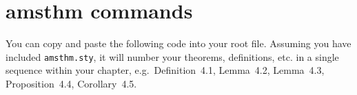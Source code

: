 
\chapter{amsthm commands}
\label{theorem}

You can copy and paste the following code into your root file.
Assuming you have included \verb"amsthm.sty", it will number your theorems,
definitions, etc. in a single sequence within your chapter,
e.g.~Definition~4.1, Lemma~4.2, Lemma~4.3, Proposition~4.4, Corollary~4.5.

\begin{smallverbatim} %
 \theoremstyle{plain}%
 \newtheorem{theorem}{Theorem}[chapter]
 \newtheorem{lemma}[theorem]{Lemma}
 \newtheorem{proposition}[theorem]{Proposition}
 \newtheorem{corollary}[theorem]{Corollary}
 \newtheorem{conjecture}[theorem]{Conjecture}

 \newtheorem*{theorem*}{Theorem}
 \newtheorem*{lemma*}{Lemma}
 \newtheorem*{proposition*}{Proposition}
 \newtheorem*{corollary*}{Corollary}
 \newtheorem*{conjecture*}{Conjecture}

 \theoremstyle{definition}
 \newtheorem{definition}[theorem]{Definition}
 \newtheorem{myexample}[theorem]{myexample}
 \newtheorem{prob}[theorem]{Problem}
 \newtheorem{remark}[theorem]{Remark}
 \newtheorem{notation}[theorem]{Notation}
 \newtheorem{exer}[theorem]{Exercise}
 \newtheorem{criterion}[theorem]{Criterion}
 \newtheorem{algorithm}[theorem]{Algorithm}
 \newtheorem{claim}[theorem]{Claim}

 \newtheorem*{definition*}{Definition}
 \newtheorem*{example*}{myexample}
 \newtheorem*{prob*}{Problem}
 \newtheorem*{remark*}{Remark}
 \newtheorem*{notation*}{Notation}
 \newtheorem*{exer*}{Exercise}
 \newtheorem*{criterion*}{Criterion}
 \newtheorem*{algorithm*}{Algorithm}
 \newtheorem*{claim*}{Claim}

 \newtheorem*{note}{Note}
 \newtheorem*{summary}{Summary}
 \newtheorem*{acknowledgement}{Acknowledgement}
 \newtheorem*{conclusion}{Conclusion}
\end{smallverbatim} %

\endinput